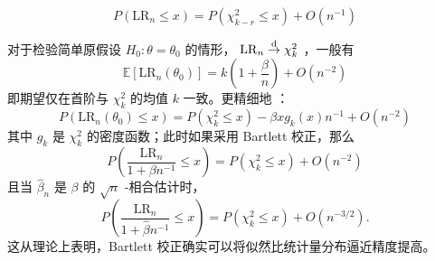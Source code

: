 $$P(\mathrm{LR}_n \le x) = P(\chi^2_{k-r} \le x) + O(n^{-1})$$

对于检验简单原假设 $H_0: \theta = \theta_0$ 的情形， $\mathrm{LR}_n\overset{\rm d}\to\chi_k^2$ ，一般有\[
\mathbb{E}[\mathrm{LR}_n(\theta_0) ] = k\left(1+\frac\beta n\right)+O(n^{-2})\]
即期望仅在首阶与 $\chi^2_k$ 的均值 $k$ 一致。更精细地 \cite{barndorffnielsencox1984,barndorffnielsenhall1988}：\[
P(\mathrm{LR}_n(\theta_0) \le x) = P(\chi^2_k \le x) - \beta x g_k(x) n^{-1} + O(n^{-2})\]
其中 $g_k$ 是 $\chi^2_k$ 的密度函数；此时如果采用 Bartlett 校正，那么\[
P\left( \frac{\mathrm{LR}_n}{1 + \beta n^{-1}} \le x \right) = P( \chi^2_{k} \le x ) + O(n^{-2})\]
且当 $\widehat\beta_n$ 是 $\beta$ 的 $\sqrt n$ -相合估计时，
\[
P\left( \frac{\mathrm{LR}_n}{1 + \widehat{\beta} n^{-1}} \le x \right) = P( \chi^2_{k} \le x ) + O(n^{-3/2}).
\]
这从理论上表明，Bartlett 校正确实可以将似然比统计量分布逼近精度提高。
